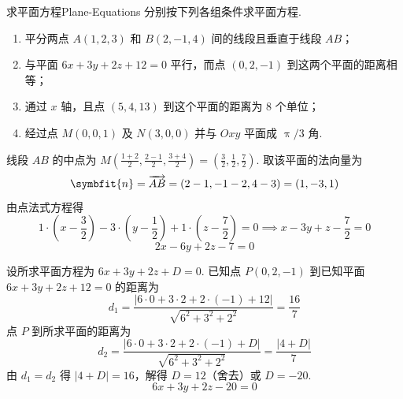 \begin{problem}{求平面方程}{Plane-Equations}
    分别按下列各组条件求平面方程.
    \begin{enumerate}
        \item 平分两点 $A(1, 2, 3)$ 和 $B(2, -1, 4)$ 间的线段且垂直于线段 $AB$；
        \item 与平面 $6x + 3y + 2z + 12 = 0$ 平行，而点 $(0, 2, -1)$ 到这两个平面的距离相等；
        \item 通过 $x$ 轴，且点 $(5, 4, 13)$ 到这个平面的距离为 $8$ 个单位；
        \item 经过点 $M(0, 0, 1)$ 及 $N(3, 0, 0)$ 并与 $Oxy$ 平面成 $\uppi/3$ 角.
    \end{enumerate}
\end{problem}

\begin{solution}

    线段 $AB$ 的中点为 $M\left(\frac{1+2}{2}, \frac{2-1}{2}, \frac{3+4}{2}\right) = \left(\frac{3}{2}, \frac{1}{2}, \frac{7}{2}\right)$.
    取该平面的法向量为
    \begin{equation}
        \symbfit{n} = \overrightarrow{AB} = (2-1, -1-2, 4-3) = (1, -3, 1)
    \end{equation}
    由点法式方程得
    \begin{equation}
        1 \cdot \left(x - \frac{3}{2}\right) - 3 \cdot \left(y - \frac{1}{2}\right) + 1 \cdot \left(z - \frac{7}{2}\right) = 0 \implies x - 3y + z - \frac{7}{2} = 0
    \end{equation}
    \begin{equation}
        \boxed{2x - 6y + 2z - 7 = 0}
    \end{equation}


    设所求平面方程为 $6x + 3y + 2z + D = 0$.
    已知点 $P(0, 2, -1)$ 到已知平面 $6x + 3y + 2z + 12 = 0$ 的距离为
    \begin{equation}
        d_1 = \frac{|6 \cdot 0 + 3 \cdot 2 + 2 \cdot (-1) + 12|}{\sqrt{6^2 + 3^2 + 2^2}} = \frac{16}{7}
    \end{equation}
    点 $P$ 到所求平面的距离为
    \begin{equation}
        d_2 = \frac{|6 \cdot 0 + 3 \cdot 2 + 2 \cdot (-1) + D|}{\sqrt{6^2 + 3^2 + 2^2}} = \frac{|4+D|}{7}
    \end{equation}
    由 $d_1 = d_2$ 得 $|4+D| = 16$，解得 $D = 12$（舍去）或 $D = -20$.
    \begin{equation}
        \boxed{6x + 3y + 2z - 20 = 0}
    \end{equation}


\end{solution}
